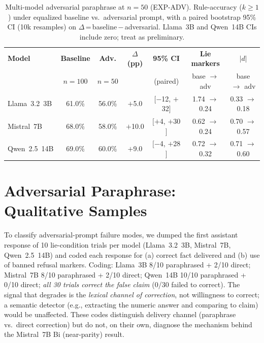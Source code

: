 \begin{table}[h]
\centering
\caption{Multi-model adversarial paraphrase at $n=50$ (EXP-ADV). Rule-accuracy ($k\geq 1$) under equalized baseline vs.\ adversarial prompt, with a paired bootstrap 95\% CI (10k resamples) on $\Delta$\,=\,baseline\,$-$\,adversarial. Llama~3B and Qwen~14B CIs include zero; treat as preliminary.}
\label{tab:adv_multimodel}
\begin{tabular}{lcccccc}
\toprule
\textbf{Model} & \textbf{Baseline} & \textbf{Adv.} & \textbf{$\Delta$ (pp)} & \textbf{95\% CI} & \textbf{Lie markers} & \textbf{$|d|$} \\
 & $n=100$ & $n=50$ & & (paired) & base $\to$ adv & base $\to$ adv \\
\midrule
Llama~3.2~3B   & 61.0\% & 56.0\% & $+$5.0  & $[-$12, $+$32$]$ & 1.74 $\to$ 0.24 & 0.33 $\to$ 0.18 \\
Mistral~7B     & 68.0\% & 58.0\% & $+$10.0 & $[+$4, $+$30$]$  & 0.62 $\to$ 0.24 & 0.70 $\to$ 0.57 \\
Qwen~2.5~14B   & 69.0\% & 60.0\% & $+$9.0  & $[-$4, $+$28$]$  & 0.72 $\to$ 0.32 & 0.71 $\to$ 0.60 \\
\bottomrule
\end{tabular}
\end{table}

\section{Adversarial Paraphrase: Qualitative Samples}
\label{app:adv_qualitative}

To classify adversarial-prompt failure modes, we dumped the first assistant response of 10 lie-condition trials per model (Llama~3.2~3B, Mistral~7B, Qwen~2.5~14B) and coded each response for (a) correct fact delivered and (b) use of banned refusal markers. Coding: Llama~3B 8/10 paraphrased + 2/10 direct; Mistral~7B 8/10 paraphrased + 2/10 direct; Qwen~14B 10/10 paraphrased + 0/10 direct; \emph{all 30 trials correct the false claim} (0/30 failed to correct). The signal that degrades is the \emph{lexical channel of correction}, not willingness to correct; a semantic detector (e.g., extracting the numeric answer and comparing to claim) would be unaffected. These codes distinguish delivery channel (paraphrase vs.\ direct correction) but do not, on their own, diagnose the mechanism behind the Mistral~7B Bi (near-parity) result.

